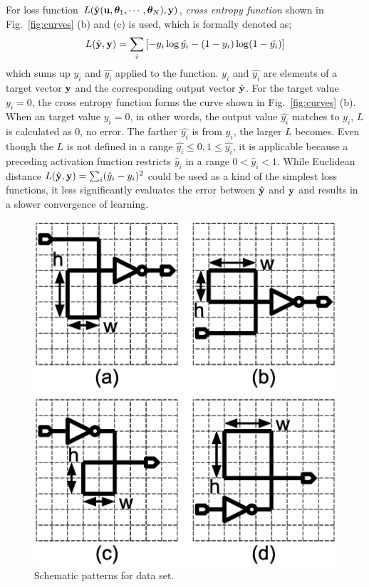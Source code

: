 \documentclass[twocolumn]{article}
\begin{document}
For loss function
$L(\hat{\bf y}({\bf u},{\bm \theta}_1,\cdots,{\bm \theta}_N),{\bf y})$,
{\it cross entropy function} shown in Fig.\ \ref{fig:curves} (b) and (c)
is used, which is formally denoted as;
\begin{eqnarray}
L(\hat{\bf y},{\bf y})
= \sum_i \left[ - y_i \log \hat{y_i} - (1-y_i) \log (1-\hat{y_i}) \right]
\end{eqnarray}
which sums up $y_i$ and $\hat{y_i}$ applied to the function.
$y_i$ and $\hat{y_i}$ are elements of a target vector ${\bf y}$ and
the corresponding output vector $\hat{\bf y}$.
For the target value $y_i = 0$,
the cross entropy function forms the curve
shown in Fig.\ \ref{fig:curves} (b).
When an target value $y_i = 0$, in other words,
the output value $\hat{y_i}$ matches to $y_i$,
$L$ is calculated as 0, no error.
The farther $\hat{y_i}$ is from $y_i$, the larger $L$ becomes.
Even though the $L$ is not defined in a range
$\hat{y_i} \le 0, 1 \le \hat{y_i}$,
it is applicable because a preceding activation function
restricts $\hat{y}_i$ in a range $0 < \hat{y}_i < 1$.
While Euclidean distance
$L(\hat{\bf y}, {\bf y}) = \sum_i (\hat{y}_i - y_i)^2$
could be used as a kind of the simplest loss functions,
it less significantly evaluates the error between $\hat{\bf y}$ and ${\bf y}$
and results in a slower convergence of learning.

\begin{figure}[!tp]
  \begin{minipage}{\hsize}
 \begin{center}
   \includegraphics[width=0.7\hsize]{fig/training_data_02.eps}
   \caption{Schematic patterns for data set.}
   \label{fig:training_data}
 \end{center}
  \end{minipage}
\end{figure}
\end{document}

